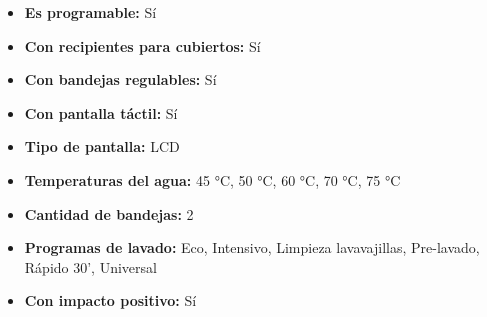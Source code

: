 \documentclass{article}
\begin{document}
\begin{adjustwidth}{2em}{}
\begin{itemize}
\begin{itemize}
    \item \textbf {Es programable:} Sí
    \item \textbf {Con recipientes para cubiertos:} Sí
    \item \textbf {Con bandejas regulables:} Sí
    \item \textbf {Con pantalla táctil:} Sí
    \item \textbf {Tipo de pantalla:} LCD
    \item \textbf {Temperaturas del agua:} 45 °C, 50 °C, 60 °C, 70 °C, 75 °C
    \item \textbf {Cantidad de bandejas:} 2
    \item \textbf {Programas de lavado:} Eco, Intensivo, Limpieza lavavajillas, Pre-lavado, Rápido 30', Universal
    \item \textbf {Con impacto positivo:} Sí
    \end{itemize}
\end{itemize}

\vspace{1\baselineskip} %
\end{adjustwidth}
\end{document}
